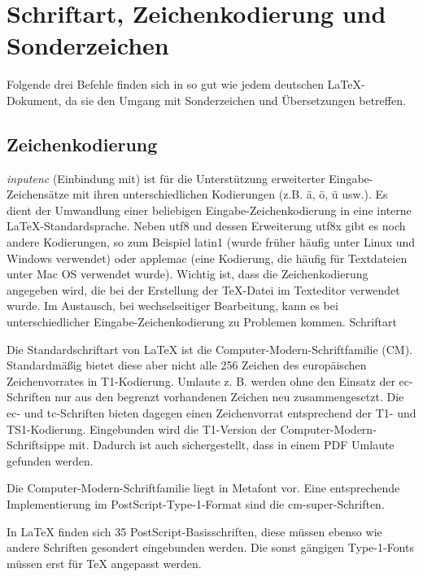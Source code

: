 
\section{Schriftart, Zeichenkodierung und Sonderzeichen}

Folgende drei Befehle finden sich in so gut wie jedem deutschen LaTeX-Dokument, da sie den Umgang mit Sonderzeichen und Übersetzungen betreffen.
\subsection{Zeichenkodierung}

\textit{inputenc} (Einbindung mit) ist für die Unterstützung erweiterter Eingabe-Zeichensätze mit ihren unterschiedlichen Kodierungen (z.B. ä, ö, ü usw.). Es dient der Umwandlung einer beliebigen Eingabe-Zeichenkodierung in eine interne LaTeX-Standardsprache. Neben utf8 und dessen Erweiterung utf8x gibt es noch andere Kodierungen, so zum Beispiel latin1 (wurde früher häufig unter Linux und Windows verwendet) oder applemac (eine Kodierung, die häufig für Textdateien unter Mac OS verwendet wurde). Wichtig ist, dass die Zeichenkodierung angegeben wird, die bei der Erstellung der TeX-Datei im Texteditor verwendet wurde. Im Austausch, bei wechselseitiger Bearbeitung, kann es bei unterschiedlicher Eingabe-Zeichenkodierung zu Problemen kommen.\cite{Ensenbach}
Schriftart

Die Standardschriftart von LaTeX ist die Computer-Modern-Schriftfamilie (CM). Standardmäßig bietet diese aber nicht alle 256 Zeichen des europäischen Zeichenvorrates in T1-Kodierung. Umlaute z. B. werden ohne den Einsatz der ec-Schriften nur aus den begrenzt vorhandenen Zeichen neu zusammengesetzt. Die ec- und tc-Schriften bieten dagegen einen Zeichenvorrat entsprechend der T1- und TS1-Kodierung. Eingebunden wird die T1-Version der Computer-Modern-Schriftsippe mit. Dadurch ist auch sichergestellt, dass in einem PDF Umlaute gefunden werden.

Die Computer-Modern-Schriftfamilie liegt in Metafont vor. Eine entsprechende Implementierung im PostScript-Type-1-Format sind die cm-super-Schriften.

In LaTeX finden sich 35 PostScript-Basisschriften, diese müssen ebenso wie andere Schriften gesondert eingebunden werden. Die sonst gängigen Type-1-Fonts müssen erst für TeX angepasst werden.

